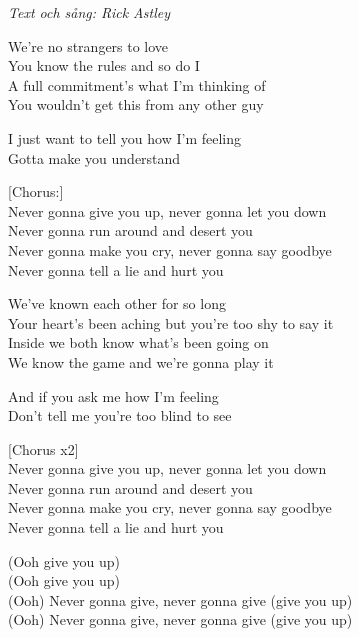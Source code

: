 {\footnotesize\textit{Text och sång: Rick Astley}}\par
\vspace{10pt}
We're no strangers to love\\
You know the rules and so do I\\
A full commitment's what I'm thinking of\\
You wouldn't get this from any other guy\par
\vspace{10pt}
I just want to tell you how I'm feeling\\
Gotta make you understand\par
\vspace{10pt}
{[}Chorus:{]}\\
Never gonna give you up, never gonna let you down\\
Never gonna run around and desert you\\
Never gonna make you cry, never gonna say goodbye\\
Never gonna tell a lie and hurt you\par
\vspace{10pt}
We've known each other for so long\\
Your heart's been aching but you're too shy to say it\\
Inside we both know what's been going on\\
We know the game and we're gonna play it\par
\vspace{10pt}
And if you ask me how I'm feeling \\
Don't tell me you're too blind to see\par
\vspace{10pt}
{[}Chorus x2{]}\\
Never gonna give you up, never gonna let you down\\
Never gonna run around and desert you\\
Never gonna make you cry, never gonna say goodbye\\
Never gonna tell a lie and hurt you\par
\newpage
(Ooh give you up)\\
(Ooh give you up)\\
(Ooh) Never gonna give, never gonna give (give you up)\\
(Ooh) Never gonna give, never gonna give (give you up)\par
\vspace{10pt}
